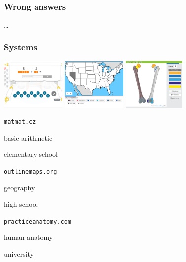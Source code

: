 \documentclass[xcolor=svgnames]{beamer}
\begin{document}
\begin{frame}
    \frametitle{Wrong answers}
    \centering
    \LARGE
    \dots
\end{frame}






\begin{frame}
    \frametitle{Systems}
    \small
    \includegraphics[height=2.5cm]{figures/matmat.png}
    \hfill
    \includegraphics[height=2.5cm]{figures/slepemapy.png}
    \hfill
    \includegraphics[height=2.5cm]{figures/anatom.png}

    \centering
    \begin{multicols}{3}
       \texttt{matmat.cz}

       \vspace{5mm}
       basic arithmetic

       \vspace{5mm}
       elementary school

    \columnbreak
       \texttt{outlinemaps.org}

       \vspace{5mm}
       geography

       \vspace{5mm}
       high school

    \columnbreak
       \texttt{practiceanatomy.com}

       \vspace{5mm}
       human anatomy

       \vspace{5mm}
       university
    \end{multicols}
\end{frame}
\end{document}
